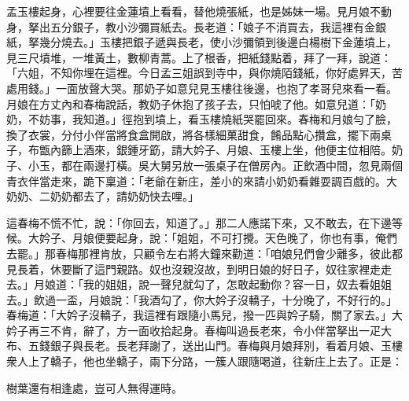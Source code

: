 孟玉樓起身，心裡要往金蓮墳上看看，替他燒張紙，也是姊妹一場。見月娘不動身，{}拏出五分銀子，教小沙彌買紙去。長老道：「娘子不消買去，我這裡有金銀紙，拏幾分燒去。」玉樓把銀子遞與長老，使小沙彌領到後邊白楊樹下金蓮墳上，見三尺墳堆，一堆黃土，數柳青蒿。{}上了根香，把紙錢點着，拜了一拜，說道：「六姐，不知你埋在這裡。今日孟三姐誤到寺中，與你燒陌錢紙，你好處昇天，苦處用錢。」一面放聲大哭。那奶子如意兒見玉樓往後邊，也抱了孝哥兒來看一看。月娘在方丈內和春梅說話，教奶子休抱了孩子去，只怕唬了他。如意兒道：「奶奶，不妨事，我知道。」徑抱到墳上，看玉樓燒紙哭罷回來。春梅和月娘勻了臉，換了衣裳，分付小伴當將食盒開啟，將各樣細菓甜食，餚品點心攢盒，擺下兩桌子，布甑內篩上酒來，銀鍾牙筯，請大妗子、月娘、玉樓上坐，他便主位相陪。奶子、小玉，都在兩邊打橫。吳大舅另放一張桌子在僧房內。正飲酒中間，忽見兩個青衣伴當走來，跪下稟道：「老爺在新庄，差小的來請小奶奶看雜耍調百戲的。大奶奶、二奶奶都去了，請奶奶快去哩。」

這春梅不慌不忙，{}說：「你回去，知道了。」那二人應諾下來，又不敢去，在下邊等候。大妗子、月娘便要起身，說：「姐姐，不可打攪。天色晚了，你也有事，俺們去罷。」那春梅那裡肯放，只顧令左右將大鐘來勸道：「咱娘兒們會少離多，彼此都見長着，休要斷了這門親路。奴也沒親沒故，到明日娘的好日子，奴往家裡走走去。」月娘道：「我的姐姐，說一聲兒就勾了，怎敢起動你？容一日，奴去看姐姐去。」{}飲過一盃，月娘說：「我酒勾了，你大妗子沒轎子，十分晚了，不好行的。」春梅道：「大妗子沒轎子，我這裡有跟隨小馬兒，撥一匹與妗子騎，關了家去。」大妗子再三不肯，辭了，方一面收拾起身。春梅叫過長老來，令小伴當拏出一疋大布、五錢銀子與長老。長老拜謝了，送出山門。春梅與月娘拜別，看着月娘、玉樓衆人上了轎子，他也坐轎子，兩下分路，一簇人跟隨喝道，往新庄上去了。正是：

\begin{myquote}
樹葉還有相逢處，豈可人無得運時。
\end{myquote}

